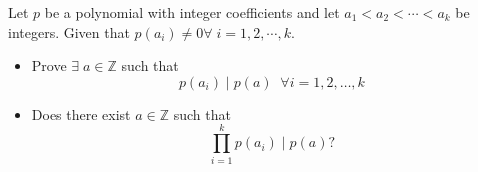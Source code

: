 Let \(p\) be a polynomial with integer coeﬃcients and let \(a_1<a_2<\cdots <a_k\) be integers. Given that \(p(a_i)\ne 0\forall\; i=1,2,\cdots, k\).
\begin{itemize}
  \item Prove \(\exists\; a\in \mathbb{Z}\) such that \[ p(a_i)\mid p(a)\;\;\forall i=1,2,\dots ,k \]
  \item Does there exist \(a\in \mathbb{Z}\) such that \[ \prod_{i=1}^{k}p(a_i)\mid p(a)?\]
\end{itemize}
